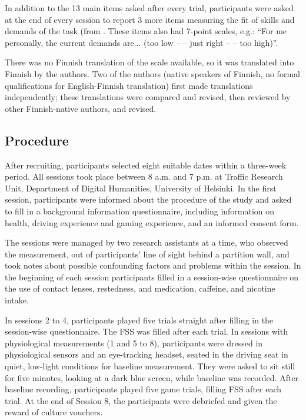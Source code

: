 \documentclass[fleqn,10pt]{wlscirep}
\begin{document}
In addition to the 13 main items asked after every trial, participants were asked at the end of every session to report 3 more items measuring the fit of skills and demands of the task (from  \cite{Rheinberg2003}. These items also had 7-point scales, e.g.: ``For me personally, the current demands are... (too low -- -- just right -- -- too high)''.

There was no Finnish translation of the scale available, so it was translated into Finnish by the authors. Two of the authors (native speakers of Finnish, no formal qualifications for English-Finnish translation) first made translations independently; these translations were compared and revised, then reviewed by other Finnish-native authors, and revised.

\subsection*{Procedure}
After recruiting, participants selected eight suitable dates within a three-week period. All sessions took place between 8 a.m. and 7 p.m. at Traffic Research Unit, Department of Digital Humanities, University of Helsinki. In the first session, participants were informed about the procedure of the study and asked to fill in a background information questionnaire, including information on health, driving experience and gaming experience, and an informed consent form.

The sessions were managed by two research assistants at a time, who observed the measurement, out of participants' line of sight behind a partition wall, and took notes about possible confounding factors and problems within the session. In the beginning of each session participants filled in a session-wise questionnaire on the use of contact lenses, restedness, and medication, caffeine, and nicotine intake.

In sessions 2 to 4, participants played five trials straight after filling in the session-wise questionnaire. The FSS was filled after each trial. In sessions with physiological measurements (1 and 5 to 8), participants were dressed in physiological sensors and an eye-tracking headset, seated in the driving seat in quiet, low-light conditions for baseline measurement. They were asked to sit still for five minutes, looking at a dark blue screen, while baseline was recorded. After baseline recording, participants played five game trials, filling FSS after each trial. At the end of Session 8, the participants were debriefed and given the reward of culture vouchers.
\end{document}
